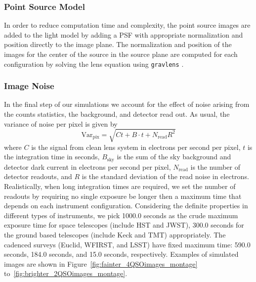 \documentclass[a4paper,11pt]{article}
\begin{document}
\subsubsection{Point Source Model}

In order to reduce computation time and complexity, the point source
images are added to the light model by adding a PSF with appropriate
normalization and position directly to the image plane. The
normalization and position of the images for the center of the source
in the source plane are computed for each configuration by solving the
lens equation using \texttt{gravlens} \cite{2011ascl.soft02003K}.


%


\subsubsection{Image Noise}

In the final step of our simulations we account for the effect of
noise arising from the counts statistics, the background, and detector
read out. As usual, the variance of noise per pixel is given by
%
\begin{equation}
   \label{eq:noise}
   \mathrm{Var}_{\mathrm{pix}} = \sqrt{Ct+B\cdot t + N_{\mathrm{read}} R^{2}}
\end{equation}
%
where $C$ is the signal from clean lens system in electrons per second
per pixel, $t$ is the integration time in seconds, $B_{\mathrm{sky}}$
is the sum of the sky background and detector dark current in
electrons per second per pixel, $N_{\mathrm{read}}$ is the number of
detector readouts, and $R$ is the standard deviation of the read noise
in electrons. Realistically, when long integration times are required,
we set the number of readouts by requiring no single exposure be
longer then a maximum time that depends on each instrument
configuration. Considering the definite properties in different types of instruments, we pick 1000.0 seconds as the crude maximum exposure time for space telescopes (include HST and JWST), 300.0 seconds for the ground based telescopes (include Keck and TMT) appropriately. The cadenced surveys (Euclid, WFIRST, and LSST) have fixed maximum time: 590.0 seconds, 184.0 seconds, and 15.0 seconds, respectively.
Examples of simulated images are shown in
Figure~\ref{fig:fainter_4QSOimages_montage}
to~\ref{fig:brighter_2QSOimages_montage}.
\end{document}
